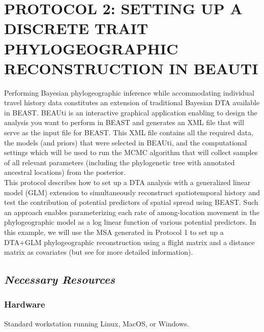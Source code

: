 \documentclass{article}
\begin{document}
\section*{PROTOCOL 2: SETTING UP A DISCRETE TRAIT PHYLOGEOGRAPHIC RECONSTRUCTION IN BEAUTI}

Performing Bayesian phylogeographic inference while accommodating individual travel history data constitutes an extension of traditional Bayesian DTA available in BEAST. %
BEAUti is an interactive graphical application enabling to design the analysis you want to perform in BEAST and generates an XML file that will serve as the input file for BEAST.
This XML file contains all the required data, the models (and priors) that were selected in BEAUti, and the computational settings which will be used to run the MCMC algorithm that will collect samples of all relevant parameters (including the phylogenetic tree with annotated ancestral locations) from the posterior. \\ 

This protocol describes how to set up a DTA analysis with a generalized linear model (GLM) extension to simultaneously reconstruct spatiotemporal history and test the contribution of potential predictors of spatial spread using BEAST. %
Such an approach enables parameterizing each rate of among-location movement in the phylogeographic model as a log linear function of various potential predictors.
In this example, we will use the MSA generated in Protocol 1 to set up a DTA+GLM phylogeographic reconstruction using a flight matrix and a distance matrix as covariates (but see \cite{travhist} for more detailed information). %

\subsection*{\textbf{\textit{Necessary Resources}}}
\subsubsection*{Hardware}
\hspace{0.5cm}Standard workstation running Linux, MacOS, or Windows. 
\end{document}

